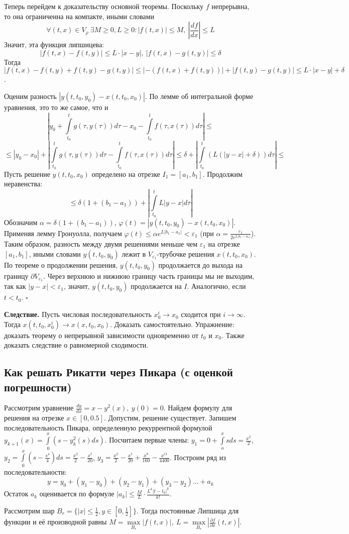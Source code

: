 Теперь перейдем к доказательству основной теоремы. Поскольку $f$ непрерывна,
то она ограниченна на компакте, иными словами
$$\forall (t,x)\in V_\rho~\exists M\geqslant 0,L\geqslant 0:
|f(t,x)|\leqslant M,~\left| \frac{df}{dx} \right|\leqslant L $$
Значит, эта функция липшицева:
$$|f(t,x)-f(t,y)|\leqslant L\cdot |x-y|,~|f(t,x)-g(t,y)|\leqslant \delta$$
Тогда $|f(t,x)-f(t,y)+f(t,y)-g(t,y)|\leqslant |-(f(t,x)+f(t,y))|+
|f(t,y)-g(t,y)|\leqslant L\cdot |x-y|+\delta$.

Оценим разность $|y(t,t_0,y_0)-x(t,t_0,x_0)|$. По лемме об интегральной
форме уравнения, это то же самое, что и 
$$\left| y_0+\int\limits_{t_0}^{t} g(\tau,y(\tau))d\tau -x_0 -
 \int\limits_{t_0}^{t} f(\tau,x(\tau))d\tau \right| \leqslant 
$$
$$
\leqslant 
|y_0-x_0|+\left|\int\limits_{t_0}^{t} g(\tau,y(\tau))d\tau -
\int\limits_{t_0}^{t} f(\tau,x(\tau))d\tau \right|\leqslant 
\delta+\left| \int\limits_{t_0}^{t} (L(|y-x|+\delta))d\tau \right|\leqslant 
$$
Пусть решение $y(t,t_0,x_0)$ определено на отрезке $I_1=[a_1,b_1]$. 
Продолжим неравенства:
$$
\leqslant \delta(1+(b_1-a_1))+\left| \int\limits_{t_0}^{t} L|y-x|d\tau\right| 
$$
Обозначим $\alpha=\delta(1+(b_1-a_1))$, 
$\varphi(t)=|y(t,t_0,y_0)-x(t,t_0,x_0)|$. Применяя лемму Гронуолла, получаем
$\varphi(t)\leqslant \alpha e^{L|b_1-a_1|}<\varepsilon_1$ (при 
$\alpha=\frac{\varepsilon_1}{2e^{L|b_1-a_1|}}$).
Таким образом, разность между двумя решениями меньше чем $\varepsilon_1$ на 
отрезке $[a_1,b_1]$, иными словами $y(t,t_0,y_0)$ лежит в 
$V_{\varepsilon_1}$-трубочке решения $x(t,t_0,x_0)$. По теореме о продолжении
решения,  $y(t,t_0,y_0)$ продолжается до выхода на границу
$\partial V_{\varepsilon_1}$. Через верхнюю и нижнюю границу часть границы
мы не выходим, так как $|y-x|<\varepsilon_1$, значит, $y(t,t_0,y_0)$
продолжается на $I$. Аналогично, если  $t<t_0$. $\square$

\textbf{Следствие.} Пусть числовая последовательность 
$x^i_0\to x_0$ сходится при $i\to\infty$. 
Тогда $x(t,t_0,x^i_0)\to x(x,t_0,x_0)$. Доказать самостоятельно. Упражнение:
доказать теорему о непрерывной зависимости одновременно от $t_0$ и $x_0$.
Также доказать следствие о равномерной сходимости.

\subsection{Как решать Рикатти через Пикара (с оценкой погрешности)}
Рассмотрим уравнение $\frac{dy}{dx}=x-y^2(x),~y(0)=0$. Найдем формулу
для решения на отрезке $x\in [0,0.5]$.
Допустим, решение существует. Запишем последовательность Пикара, определенную
рекуррентной формулой $y_{k+1}(x)=\int\limits_{0}^{x}(s-y^2_k(s)ds)$.
Посчитаем первые члены: $y_1=0+\int\limits_{o}^{x}sds=\frac{x^2}{2}$,
$y_2=\int\limits_{0}^{x}\left( s-\frac{s^4}{4}\right)ds=\frac{x^2}{2}-
\frac{x^5}{20}$, $y_3=\frac{x^2}{2}-\frac{x^5}{20}+\frac{x^8}{160}-
\frac{x^{11}}{4400}$. Построим ряд из последовательности:
$$y=y_0+(y_1-y_0)+(y_2-y_1)+(y_3-y_2)...+a_k$$ 
Остаток $a_k$ оценивается по формуле  $|a_k|\leqslant \frac{M}{L}\cdot 
\frac{L^k|t-t_0|^k}{k!}$. 

Рассмотрим шар $B_r=\{|x|\leqslant \frac{1}{2},y\in [0,\frac{1}{2}]\}$. 
Тогда постоянные Липшица для функции и её производной равны
$M=\max\limits_{B_r}|f(t,x)|,~
L=\max\limits_{B_r}|\frac{\partial f}{\partial x} (t,x)|$. 

